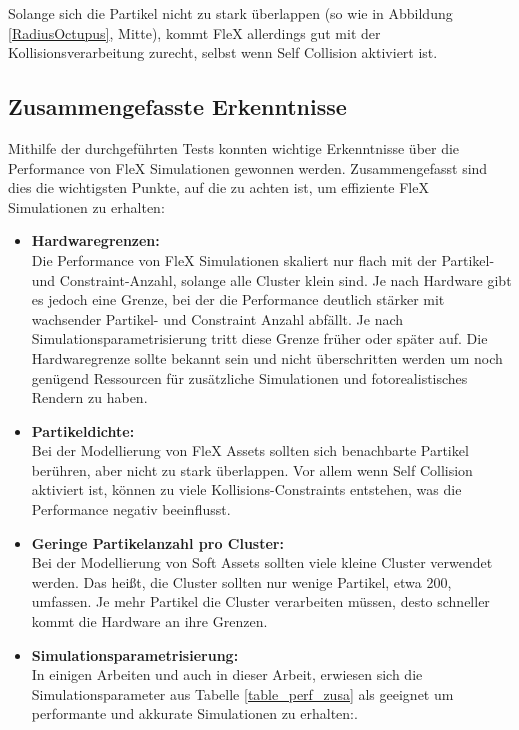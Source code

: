 Solange sich die Partikel nicht zu stark überlappen (so wie in Abbildung \ref{RadiusOctupus}, Mitte), kommt FleX allerdings gut mit der Kollisionsverarbeitung zurecht, selbst wenn Self Collision aktiviert ist.

\subsection{Zusammengefasste Erkenntnisse}
\label{subsec_perf_zusa}

Mithilfe der durchgeführten Tests konnten wichtige Erkenntnisse über die Performance von FleX Simulationen gewonnen werden. Zusammengefasst sind dies die wichtigsten Punkte, auf die zu achten ist, um effiziente FleX Simulationen zu erhalten:

    \begin{itemize}
    
      \item \textbf{Hardwaregrenzen:} \\Die Performance von FleX Simulationen skaliert nur flach mit der Partikel- und Constraint-Anzahl, solange alle Cluster klein sind. Je nach Hardware gibt es jedoch eine Grenze, bei der die Performance deutlich stärker mit wachsender Partikel- und Constraint Anzahl abfällt. Je nach Simulationsparametrisierung tritt diese Grenze früher oder später auf. Die Hardwaregrenze sollte bekannt sein und nicht überschritten werden um noch genügend Ressourcen für zusätzliche Simulationen und fotorealistisches Rendern zu haben.
      
      \item \textbf{Partikeldichte:} \\ Bei der Modellierung von FleX Assets sollten sich benachbarte Partikel berühren, aber nicht zu stark überlappen. Vor allem wenn Self Collision aktiviert ist, können zu viele Kollisions-Constraints entstehen, was die Performance negativ beeinflusst.
      
      \item \textbf{Geringe Partikelanzahl pro Cluster:} \\ Bei der Modellierung von Soft Assets sollten viele kleine Cluster verwendet werden. Das heißt, die Cluster sollten nur wenige Partikel, etwa 200, umfassen. Je mehr Partikel die Cluster verarbeiten müssen, desto schneller kommt die Hardware an ihre Grenzen.
      
      \item \textbf{Simulationsparametrisierung:} \\ In einigen Arbeiten und auch in dieser Arbeit, erwiesen sich die Simulationsparameter aus Tabelle \ref{table_perf_zusa} als geeignet um performante und akkurate Simulationen zu erhalten:.
      
    \end{itemize}

